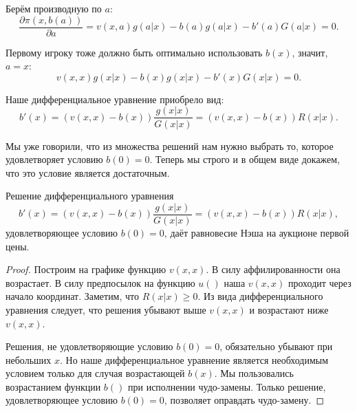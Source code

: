 \begin{itemize}
Берём производную по $ a $:
\begin{equation}
\frac{\partial \pi(x,b(a))}{\partial a}=v(x,a)g(a|x)-b(a)g(a|x)-b'(a)G(a|x)=0.
\end{equation}

Первому игроку тоже должно быть оптимально использовать $ b(x) $, значит, $ a=x $:
\begin{equation}
v(x,x)g(x|x)-b(x)g(x|x)-b'(x)G(x|x)=0.
\end{equation}

Наше дифференциальное уравнение приобрело вид:
\begin{equation}
\label{b_first_de}
b'(x)=(v(x,x)-b(x))\frac{g(x|x)}{G(x|x)}=(v(x,x)-b(x))R(x|x).
\end{equation}

Мы уже говорили, что из множества решений нам нужно выбрать то, которое удовлетворяет условию $ b(0)=0 $. Теперь мы строго и в общем виде докажем, что это условие является достаточным.


\begin{myth}
Решение дифференциального уравнения
\begin{equation}
b'(x)=(v(x,x)-b(x))\frac{g(x|x)}{G(x|x)}=(v(x,x)-b(x))R(x|x),
\end{equation}
удовлетворяющее условию $ b(0)=0 $, даёт равновесие Нэша на аукционе первой цены.
\end{myth}

\begin{proof}


Построим на графике функцию $ v(x,x) $. В силу аффилированности она возрастает. В силу предпосылок на функцию $ u() $ наша $ v(x,x) $ проходит через начало координат. Заметим, что $ R(x|x)\geq 0 $. Из вида дифференциального уравнения следует, что решения убывают выше $ v(x,x) $ и возрастают ниже $ v(x,x) $.




Решения, не удовлетворяющие условию $ b(0)=0 $, обязательно убывают при небольших $ x $. Но наше дифференциальное уравнение является необходимым условием только для случая возрастающей $ b(x) $. Мы пользовались возрастанием функции $ b() $ при исполнении чудо-замены. Только решение,  удов\-лет\-во\-ряю\-щее условию $ b(0)=0 $, позволяет оправдать чудо-замену.


\end{proof}
\end{itemize}
